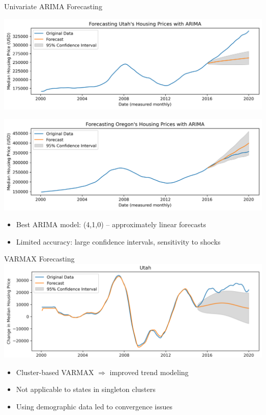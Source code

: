 \documentclass{beamer}
\begin{document}
\begin{frame}{Univariate ARIMA Forecasting} 
\begin{center}
  \includegraphics[width=0.75\linewidth]{figures/Utah_forecast_long.png}
\end{center}
\begin{center}
  \includegraphics[width=0.75\linewidth]{figures/Oregon_forecast_long.png}
\end{center}
  \begin{itemize}%
    \item Best ARIMA model: (4,1,0) -- approximately linear forecasts
    \item Limited accuracy: large confidence intervals, sensitivity to shocks
  \end{itemize}
\end{frame}

\begin{frame}{VARMAX Forecasting} 
  \includegraphics[width=0.9\linewidth]{figures/utah_varmax.png}
  \begin{itemize}%
    \item Cluster-based VARMAX $\Rightarrow$ improved trend modeling
    \item Not applicable to states in singleton clusters
    \item Using demographic data led to convergence issues
  \end{itemize}
\end{frame}
\end{document}
